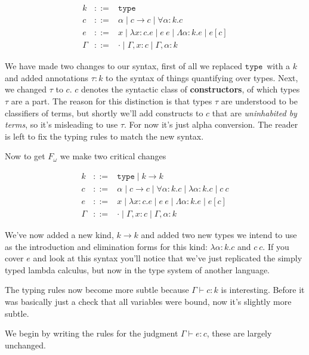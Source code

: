 \documentclass{article}
\newcommand{\type}{\ensuremath{\mathtt{type}}}
\begin{document}
\[
\begin{array}{lcl}
  k & ::= & \type\\
  c & ::= & \alpha \mid c \to c \mid \forall \alpha : k. c\\
  e & ::= & x \mid \lambda x : c. e \mid e\ e \mid
            \Lambda \alpha : k. e \mid e[c]\\
  \Gamma & ::= & \cdot \mid \Gamma, x : c \mid \Gamma, \alpha : k
\end{array}
\]

We have made two changes to our syntax, first of all we replaced \type \, with a
$k$ and added annotations $\tau : k$ to the syntax of things quantifying over
types. Next, we changed $\tau$ to $c$. $c$ denotes the syntactic class of {\bf
constructors}, of which types $\tau$ are a part. The reason for this distinction
is that types $\tau$ are understood to be classifiers of terms, but shortly
we'll add constructs to $c$ that are \emph{uninhabited by terms}, so it's
misleading to use $\tau$. For now it's just alpha conversion. The reader is left
to fix the typing rules to match the new syntax.

Now to get $F_\omega$ we make two critical changes

\[
\begin{array}{lcl}
  k & ::= & \type \mid k \to k\\
  c & ::= & \alpha \mid c \to c \mid \forall \alpha : k. c
            \mid \lambda \alpha : k. c \mid c\ c\\
  e & ::= & x \mid \lambda x : c. e \mid e\ e \mid
            \Lambda \alpha : k. e \mid e[c]\\
  \Gamma & ::= & \cdot \mid \Gamma, x : c \mid \Gamma, \alpha : k
\end{array}
\]

We've now added a new kind, $k \to k$ and added two new types we
intend to use as the introduction and elimination forms for this
kind: $\lambda \alpha : k. c$ and $c\ c$. If you cover $e$ and look at
this syntax you'll notice that we've just replicated the simply typed
lambda calculus, but now in the type system of another language.

The typing rules now become more subtle because $\Gamma \vdash c : k$
is interesting. Before it was basically just a check that all
variables were bound, now it's slightly more subtle.

We begin by writing the rules for the judgment $\Gamma \vdash e : c$,
these are largely unchanged.
\end{document}
